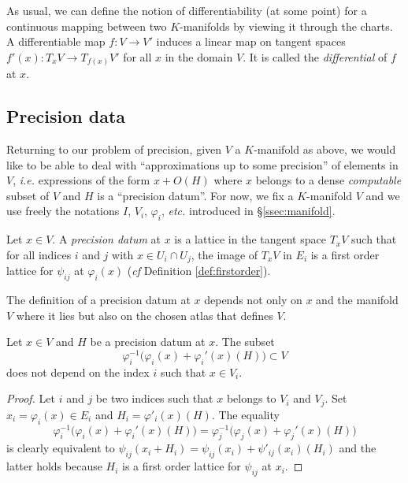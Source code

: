 \documentclass{lms}
\begin{document}
As usual, we can define the notion of differentiability (at some 
point) for a continuous mapping between two $K$-manifolds by viewing it 
through the charts. A  differentiable map $f : V \to V'$ induces 
a linear map on tangent spaces $f'(x) : T_x V \to T_{f(x)} V'$ for all 
$x$ in the domain $V$. It is called the \emph{differential} of $f$ at
$x$.

\subsection{Precision data}

Returning to our problem of precision, given $V$ a $K$-manifold as 
above, we would like to be able to deal with ``approximations up to some 
precision'' of elements in $V$, \emph{i.e.} expressions of the form $x + 
O(H)$ where $x$ belongs to a dense \emph{computable} subset of $V$ and 
$H$ is a ``precision datum''.
For now, we fix a $K$-manifold $V$ and we use freely the notations $I$, 
$V_i$, $\varphi_i$, \emph{etc.} introduced in \S \ref{ssec:manifold}.

\begin{deftn}
Let $x \in V$.
A \emph{precision datum} at $x$ is a lattice in the tangent space 
$T_x V$ such that for all indices $i$ and $j$ with $x \in U_i \cap
U_j$, the image of $T_x V$ in $E_i$ is a first order lattice for
$\psi_{ij}$ at $\varphi_i(x)$ (\emph{cf} Definition \ref{def:firstorder}).
\end{deftn}

\begin{rmk}
The definition of a precision datum at $x$ depends not only on $x$
and the manifold $V$ where it lies but also on the chosen atlas that
defines $V$.
\end{rmk}

\begin{lem}
\label{lem:independence}
Let $x \in V$ and $H$ be a precision datum at $x$.
The subset
$$\varphi_i^{-1}\big(\varphi_i(x) + \varphi_i'(x)(H)\big) 
\subset V$$
does not depend on the index $i$ such that $x \in V_i$.
\end{lem}

\begin{proof}
Let $i$ and $j$ be two indices such that $x$ belongs to $V_i$ and $V_j$. 
Set $x_i = \varphi_i(x) \in E_i$ and $H_i = \varphi'_i(x)(H)$. The 
equality 
\[
\varphi_i^{-1}\big(\varphi_i(x) + \varphi_i'(x)(H)\big) 
 = \varphi_j^{-1}\big(\varphi_j(x) + \varphi_j'(x)(H)\big)
 \]
is clearly equivalent to
$\psi_{ij}(x_i + H_i) = \psi_{ij}(x_i) + \psi'_{ij}(x_i)(H_i)$
and the latter holds because $H_i$ is a first order lattice
for $\psi_{ij}$ at $x_i$.
\end{proof}
\end{document}
